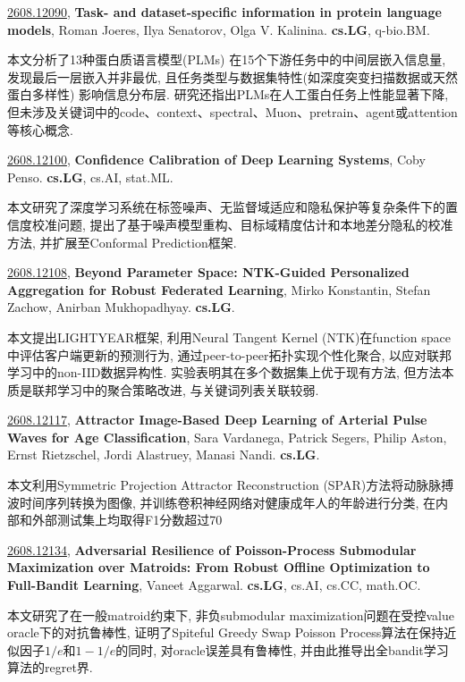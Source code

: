 \documentclass[9pt, a4paper]{article}
\theoremstyle{plain}
\theoremstyle{definition}
\theoremstyle{remark}
\newcommand{\arxivwithtarget}[3]{\hypertarget{#1}{}\href{https://arxiv.org/abs/#1}{#1}, \textbf{\textcolor{arxivblue}{#2}}, #3. }
\begin{document}
\arxivwithtarget{2608.12090}{Task- and dataset-specific information in protein language models}{Roman Joeres, Ilya Senatorov, Olga V. Kalinina}\textbf{cs.LG}, q-bio.BM.

本文分析了13种蛋白质语言模型(PLMs) 在15个下游任务中的中间层嵌入信息量, 发现最后一层嵌入并非最优, 且任务类型与数据集特性(如深度突变扫描数据或天然蛋白多样性) 影响信息分布层. 研究还指出PLMs在人工蛋白任务上性能显著下降, 但未涉及关键词中的code、context、spectral、Muon、pretrain、agent或attention等核心概念.


\arxivwithtarget{2608.12100}{Confidence Calibration of Deep Learning Systems}{Coby Penso}\textbf{cs.LG}, cs.AI, stat.ML.

本文研究了深度学习系统在标签噪声、无监督域适应和隐私保护等复杂条件下的置信度校准问题, 提出了基于噪声模型重构、目标域精度估计和本地差分隐私的校准方法, 并扩展至Conformal Prediction框架.


\arxivwithtarget{2608.12108}{Beyond Parameter Space: NTK-Guided Personalized Aggregation for Robust Federated Learning}{Mirko Konstantin, Stefan Zachow, Anirban Mukhopadhyay}\textbf{cs.LG}.

本文提出LIGHTYEAR框架, 利用Neural Tangent Kernel (NTK)在function space中评估客户端更新的预测行为, 通过peer-to-peer拓扑实现个性化聚合, 以应对联邦学习中的non-IID数据异构性. 实验表明其在多个数据集上优于现有方法, 但方法本质是联邦学习中的聚合策略改进, 与关键词列表关联较弱.


\arxivwithtarget{2608.12117}{Attractor Image-Based Deep Learning of Arterial Pulse Waves for Age Classification}{Sara Vardanega, Patrick Segers, Philip Aston, Ernst Rietzschel, Jordi Alastruey, Manasi Nandi}\textbf{cs.LG}.

本文利用Symmetric Projection Attractor Reconstruction (SPAR)方法将动脉脉搏波时间序列转换为图像, 并训练卷积神经网络对健康成年人的年龄进行分类, 在内部和外部测试集上均取得F1分数超过70%


\arxivwithtarget{2608.12134}{Adversarial Resilience of Poisson-Process Submodular Maximization over Matroids: From Robust Offline Optimization to Full-Bandit Learning}{Vaneet Aggarwal}\textbf{cs.LG}, cs.AI, cs.CC, math.OC.

本文研究了在一般matroid约束下, 非负submodular maximization问题在受控value oracle下的对抗鲁棒性, 证明了Spiteful Greedy Swap Poisson Process算法在保持近似因子$1/e$和$1-1/e$的同时, 对oracle误差具有鲁棒性, 并由此推导出全bandit学习算法的regret界.
\end{document}
